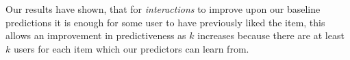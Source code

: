 Our results have shown, that for \emph{interactions} to improve upon our baseline predictions it is enough for some user to 
have previously liked the item, this allows an improvement in predictiveness as $k$ increases because there are at least $k$ users for each item
which our predictors can learn from.

